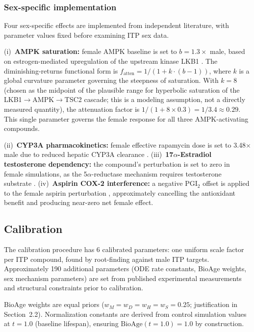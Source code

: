 \documentclass[11pt]{article}
\begin{document}
\subsubsection{Sex-specific implementation}

Four sex-specific effects are implemented from independent literature, with parameter values fixed before examining ITP sex data.

(i)~\textbf{AMPK saturation:} female AMPK baseline is set to $b = 1.3\times$ male, based on estrogen-mediated upregulation of the upstream kinase LKB1 \citep{Boudaba2018,McInnes2011}. The diminishing-returns functional form is $f_{\text{atten}} = 1/(1 + k \cdot (b - 1))$, where $k$ is a global curvature parameter governing the steepness of saturation. With $k = 8$ (chosen as the midpoint of the plausible range for hyperbolic saturation of the LKB1$\to$AMPK$\to$TSC2 cascade; this is a modeling assumption, not a directly measured quantity), the attenuation factor is $1/(1 + 8 \times 0.3) = 1/3.4 \approx 0.29$. This single parameter governs the female response for all three AMPK-activating compounds.

(ii)~\textbf{CYP3A pharmacokinetics:} female effective rapamycin dose is set to 3.48$\times$ male due to reduced hepatic CYP3A clearance \citep{Lamming2014}. (iii)~\textbf{17$\alpha$-Estradiol testosterone dependency:} the compound's perturbation is set to zero in female simulations, as the 5$\alpha$-reductase mechanism requires testosterone substrate \citep{Garratt2018}. (iv)~\textbf{Aspirin COX-2 interference:} a negative PGI$_2$ offset is applied to the female aspirin perturbation \citep{Egan2004}, approximately cancelling the antioxidant benefit and producing near-zero net female effect.

\subsection{Calibration}

The calibration procedure has 6 calibrated parameters: one uniform scale factor per ITP compound, found by root-finding against male ITP targets. Approximately 190 additional parameters (ODE rate constants, BioAge weights, sex mechanism parameters) are set from published experimental measurements and structural constraints prior to calibration.

BioAge weights are equal priors ($w_M = w_D = w_H = w_S = 0.25$; justification in Section~2.2). Normalization constants are derived from control simulation values at $t = 1.0$ (baseline lifespan), ensuring $\text{BioAge}(t = 1.0) = 1.0$ by construction.
\end{document}
